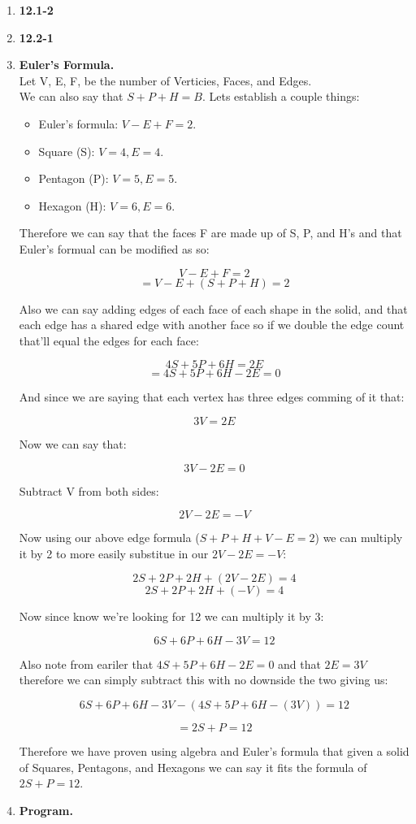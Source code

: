 \documentclass{article}
\begin{document}
\begin{enumerate}
    \item \textbf{12.1-2}
    \item \textbf{12.2-1}
    \item \textbf{Euler's Formula.} \\
    
    Let V, E, F, be the number of Verticies, Faces, and Edges. \\
    We can also say that $S + P + H = B$.
    Lets establish a couple things: 
    \begin{itemize}
        \item Euler's formula: $V - E + F = 2$.
        \item Square (S): $V = 4, E = 4$.
        \item Pentagon (P): $V = 5, E = 5$.
        \item Hexagon (H): $V = 6, E = 6$.
    \end{itemize}

    Therefore we can say that the faces F are made up of S, P, and H's and that Euler's formual can be modified as so:

    \[V - E + F = 2\]
    \[= V - E + (S + P + H) = 2\]

    Also we can say adding edges of each face of each shape in the solid, and that each edge has a shared edge with another face so if we double the edge count that'll equal the edges for each face:

    \[4S + 5P + 6H = 2E\]
    \[= 4S + 5P + 6H - 2E = 0\]
    
    And since we are saying that each vertex has three edges comming of it that:

    \[3V = 2E\]

    Now we can say that:

    \[3V - 2E = 0\]

    Subtract V from both sides:

    \[2V - 2E = -V\]

    Now using our above edge formula ($S + P + H + V - E = 2$) we can multiply it by 2 to more easily substitue in our $2V - 2E = -V$:

    \[2S + 2P + 2H + (2V - 2E) = 4\]
    \[2S + 2P + 2H + (-V) = 4\]

    Now since know we're looking for 12 we can multiply it by 3:

    \[6S + 6P + 6H - 3V = 12\]

    Also note from eariler that $4S + 5P + 6H - 2E = 0$ and that $2E = 3V$ therefore we can simply subtract this with no downside the two giving us:

    \[6S + 6P + 6H - 3V - (4S + 5P + 6H - (3V)) = 12\]

    \[= 2S + P = 12\]

    Therefore we have proven using algebra and Euler's formula that given a solid of Squares, Pentagons, and Hexagons we can say it fits the formula of $2S + P = 12$.

    \item \textbf{Program.}

  \end{enumerate}
\end{document}
